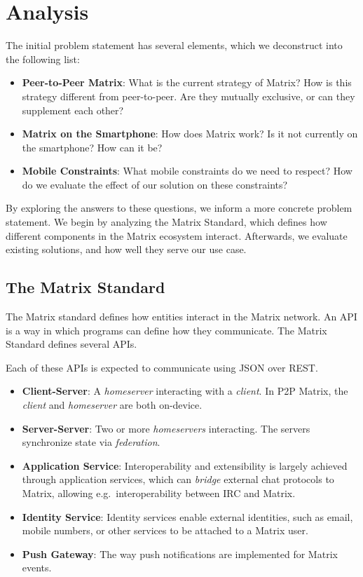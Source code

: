 \chapter{Analysis}
The initial problem statement has several elements, which we deconstruct into the following list:
\begin{itemize}
	\item{
	      \textbf{Peer-to-Peer Matrix}:
	      What is the current strategy of Matrix?
	      How is this strategy different from peer-to-peer.
	      Are they mutually exclusive, or can they supplement each other?
	      }
	\item{
	      \textbf{Matrix on the Smartphone}:
	      How does Matrix work?
	      Is it not currently on the smartphone?
	      How can it be?
	      }
	\item{
	      \textbf{Mobile Constraints}:
	      What mobile constraints do we need to respect?
	      How do we evaluate the effect of our solution on these constraints?
	      }
\end{itemize}

By exploring the answers to these questions, we inform a more concrete problem statement.
We begin by analyzing the Matrix Standard, which defines how different components in the Matrix ecosystem interact.
Afterwards, we evaluate existing solutions, and how well they serve our use case.

\section{The Matrix Standard}
The Matrix standard defines how entities interact in the Matrix network.
An \ac{API} is a way in which programs can define how they communicate.
The Matrix Standard defines several \ac{API}s.

Each of these \ac{API}s is expected to communicate using \ac{JSON} over \ac{REST}.
\begin{itemize}
	\item \textbf{Client-Server}:
	      A \textit{homeserver} interacting with a \textit{client}.
	      In \ac{P2P} Matrix, the \textit{client} and \textit{homeserver} are both on-device.
	\item \textbf{Server-Server}:
	      Two or more \textit{homeservers} interacting.
	      The servers synchronize state via \textit{federation}.
	\item \textbf{Application Service}:
	      Interoperability and extensibility is largely achieved through application services, which can \textit{bridge} external chat protocols to Matrix, allowing e.g.~interoperability between \ac{IRC} and Matrix.
	\item \textbf{Identity Service}:
	      Identity services enable external identities, such as email, mobile numbers, or other services to be attached to a Matrix user.
	\item \textbf{Push Gateway}:
	      The way push notifications are implemented for Matrix events.
\end{itemize}

